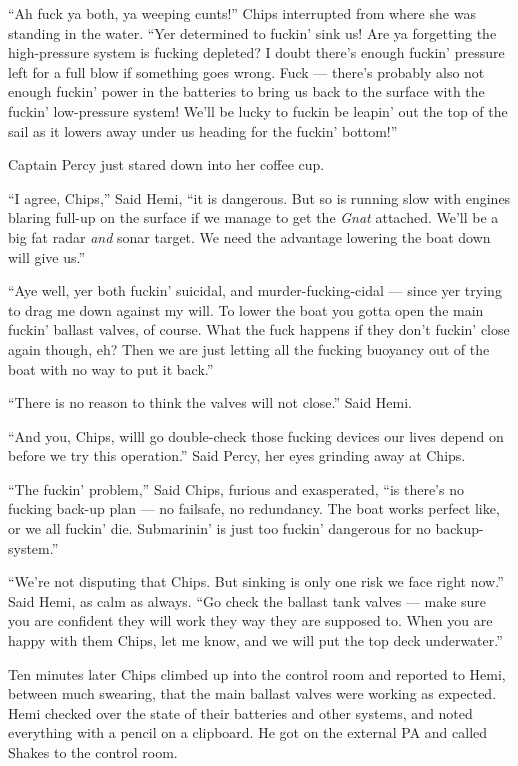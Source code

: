 \documentclass[]{scrbook}
\begin{document}
``Ah fuck ya both, ya weeping cunts!'' Chips interrupted from where she
was standing in the water. ``Yer determined to fuckin' sink us! Are ya
forgetting the high-pressure system is fucking depleted? I doubt there's
enough fuckin' pressure left for a full blow if something goes wrong.
Fuck --- there's probably also not enough fuckin' power in the batteries
to bring us back to the surface with the fuckin' low-pressure system!
We'll be lucky to fuckin be leapin' out the top of the sail as it lowers
away under us heading for the fuckin' bottom!''

Captain Percy just stared down into her coffee cup.

``I agree, Chips,'' Said Hemi, ``it is dangerous. But so is running slow
with engines blaring full-up on the surface if we manage to get the
\emph{Gnat} attached. We'll be a big fat radar \emph{and} sonar target.
We need the advantage lowering the boat down will give us.''

``Aye well, yer both fuckin' suicidal, and murder-fucking-cidal ---
since yer trying to drag me down against my will. To lower the boat you
gotta open the main fuckin' ballast valves, of course. What the fuck
happens if they don't fuckin' close again though, eh? Then we are just
letting all the fucking buoyancy out of the boat with no way to put it
back.''

``There is no reason to think the valves will not close.'' Said Hemi.

``And you, Chips, willl go double-check those fucking devices our lives
depend on before we try this operation.'' Said Percy, her eyes grinding
away at Chips.

``The fuckin' problem,'' Said Chips, furious and exasperated, ``is
there's no fucking back-up plan --- no failsafe, no redundancy. The boat
works perfect like, or we all fuckin' die. Submarinin' is just too
fuckin' dangerous for no backup-system.''

``We're not disputing that Chips. But sinking is only one risk we face
right now.'' Said Hemi, as calm as always. ``Go check the ballast tank
valves --- make sure you are confident they will work they way they are
supposed to. When you are happy with them Chips, let me know, and we
will put the top deck underwater.''

Ten minutes later Chips climbed up into the control room and reported to
Hemi, between much swearing, that the main ballast valves were working
as expected. Hemi checked over the state of their batteries and other
systems, and noted everything with a pencil on a clipboard. He got on
the external PA and called Shakes to the control room.
\end{document}

